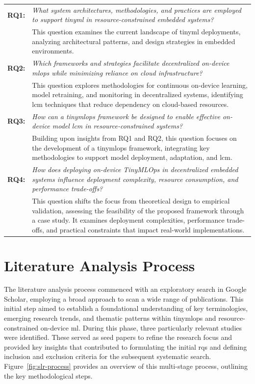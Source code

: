 \begin{tabularx}{\textwidth}{@{}lX@{}}
    \textbf{RQ1:} & \emph{What system architectures, methodologies, and practices are employed to support \gls{tinyml} in resource-constrained embedded systems?} \\  
                  & This question examines the current landscape of \gls{tinyml} deployments, analyzing architectural patterns, and design strategies in embedded environments. \\[0.5em]

    \textbf{RQ2:} & \emph{Which frameworks and strategies facilitate decentralized on-device \gls{mlops} while minimizing reliance on cloud infrastructure?} \\  
                  & This question explores methodologies for continuous on-device learning, model retraining, and monitoring in decentralized systems, identifying \gls{lcm} techniques that reduce dependency on cloud-based resources. \\[0.5em]

    \textbf{RQ3:} & \emph{How can a \gls{tinymlops} framework be designed to enable effective on-device model \gls{lcm} in resource-constrained systems?} \\  
                  & Building upon insights from RQ1 and RQ2, this question focuses on the development of a \gls{tinymlops} framework, integrating key methodologies to support model deployment, adaptation, and \gls{lcm}. \\[0.5em]

    \textbf{RQ4:} & \emph{How does deploying on-device TinyMLOps in decentralized embedded systems influence deployment complexity, resource consumption, and performance trade-offs?} \\  
                  & This question shifts the focus from theoretical design to empirical validation, assessing the feasibility of the proposed framework through a case study. It examines deployment complexities, performance trade-offs, and practical constraints that impact real-world implementations. \\  
\end{tabularx}


\section{Literature Analysis Process}
\label{sec:LiteratureReviewProcess}

The literature analysis process commenced with an exploratory search in Google Scholar, employing a broad approach to scan a wide range of publications. This initial step aimed to establish a foundational understanding of key terminologies, emerging research trends, and thematic patterns within \gls{tinymlops} and resource-constrained on-device \gls{ml}. During this phase, three particularly relevant studies were identified. These served as seed papers to refine the research focus and provided key insights that contributed to formulating the initial \glspl{rq} and defining inclusion and exclusion criteria for the subsequent systematic search. Figure~\ref{fig:slr-process} provides an overview of this multi-stage process, outlining the key methodological steps.


